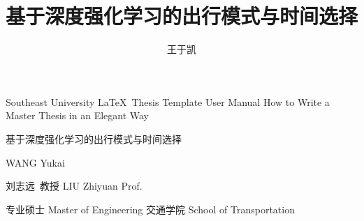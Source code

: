 \documentclass[algorithmlist,figurelist,tablelist,nomlist]{template/seumasterthesis}
\begin{document}

\title
    {基于深度强化学习的出行模式与时间选择}        %
    {}         %
    {Southeast University \LaTeX ~Thesis Template User Manual}  %
    {How to Write a Master Thesis in an Elegant Way}            %

\spine
    {基于深度强化学习的出行模式与时间选择} 
    {}                                                               

\author
    {王于凯}                        %
    {WANG Yukai}                  %

\advisor
    {刘志远\ 教授}                %
    {LIU Zhiyuan}        %
    {Prof.}                     %
    
\degreetype                        %
    {专业硕士}
    {Master of Engineering}
\authorizedate{}                  %
\committeechair{}               %
\reviewer{}{}            %
\department                        %
    {交通学院}
    {School of Transportation}
\end{document}
